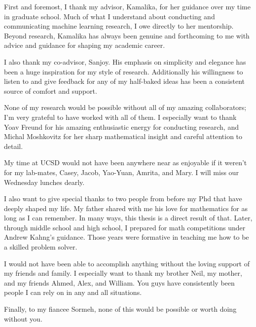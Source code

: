 \documentclass[12pt]{ucsddissertation}
\begin{document}
\begin{acknowledgements}
First and foremost, I thank my advisor, Kamalika, for her guidance over my time in graduate school. Much of what I understand about conducting and communicating machine learning research, I owe directly to her mentorship. Beyond research, Kamalika has always been genuine and forthcoming to me with advice and guidance for shaping my academic career. 

I also thank my co-advisor, Sanjoy. His emphasis on simplicity and elegance has been a huge inspiration for my style of research. Additionally his willingness to listen to and give feedback for any of my half-baked ideas has been a consistent source of comfort and support. 

None of my research would be possible without all of my amazing collaborators; I'm very grateful to have worked with all of them. I especially want to thank Yoav Freund for  his amazing enthusiastic energy for conducting research, and Michal Moshkovitz for her sharp mathematical insight and careful attention to detail.

My time at UCSD would not have been anywhere near as enjoyable if it weren't for my lab-mates, Casey, Jacob, Yao-Yuan, Amrita, and Mary. I will miss our Wednesday lunches dearly. 

I also want to give special thanks to two people from before my Phd that have deeply shaped my life. My father shared with me his love for mathematics for as long as I can remember. In many ways, this thesis is a direct result of that. Later, through middle school and high school, I prepared for math competitions under Andrew Kahng's guidance. Those years were formative in teaching me how to be a skilled problem solver.

I would not have been able to accomplish anything without the loving support of my friends and family. I especially want to thank my brother Neil, my mother, and my friends Ahmed, Alex, and William. You guys have consistently been people I can rely on in any and all situations.

Finally, to my fiancee Sormeh, none of this would be possible or worth doing without you. 







\end{acknowledgements}
\end{document}
